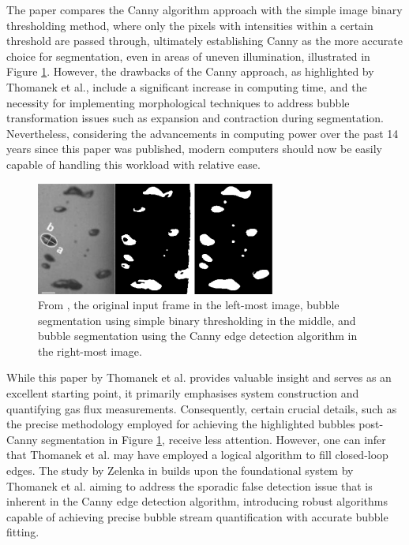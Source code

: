 The paper compares the Canny algorithm approach with the simple image binary thresholding method, where only the pixels with intensities within a certain threshold are passed through, ultimately establishing Canny as the more accurate choice for segmentation, even in areas of uneven illumination, illustrated in Figure \ref{fig:canny_segmentation_compare}. However, the drawbacks of the Canny approach, as highlighted by Thomanek et al., include a significant increase in computing time, and the necessity for implementing morphological techniques to address bubble transformation issues such as expansion and contraction during segmentation. Nevertheless, considering the advancements in computing power over the past 14 years since this paper was published, modern computers should now be easily capable of handling this workload with relative ease.

\begin{figure}[H]
    \centering
    \includegraphics[width=0.7\textwidth]{assets/bubble-segmentation-canny-thresholding.png}
    \caption{From \cite{thomanekAutomatedGasBubble2010}, the original input frame in the left-most image, bubble segmentation using simple binary thresholding in the middle, and bubble segmentation using the Canny edge detection algorithm in the right-most image.}
    \label{fig:canny_segmentation_compare}
\end{figure}

While this paper by Thomanek et al. provides valuable insight and serves as an excellent starting point, it primarily emphasises system construction and quantifying gas flux measurements. Consequently, certain crucial details, such as the precise methodology employed for achieving the highlighted bubbles post-Canny segmentation in Figure \ref{fig:canny_segmentation_compare}, receive less attention. However, one can infer that Thomanek et al. may have employed a logical algorithm to fill closed-loop edges. The study by Zelenka in \cite{zelenkaGasBubbleShape2014a} builds upon the foundational system by Thomanek et al. aiming to address the sporadic false detection issue that is inherent in the Canny edge detection algorithm, introducing robust algorithms capable of achieving precise bubble stream quantification with accurate bubble fitting.

